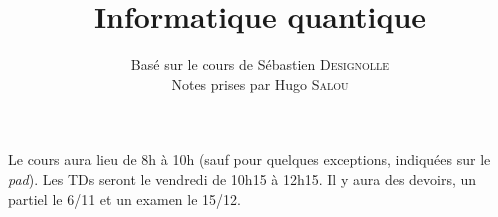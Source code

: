 \documentclass{../notes}
\title{Informatique quantique}
\author{Basé sur le cours de Sébastien \textsc{Designolle} \\ Notes prises par Hugo \textsc{Salou}}
\begin{document}
  \maketitle

  \dominitoc
  \tableofcontents

  \pagebreak

  Le cours aura lieu de 8h à 10h (sauf pour quelques exceptions, indiquées sur le \textit{pad}).
  Les TDs seront le vendredi de 10h15 à 12h15.
  Il y aura des devoirs, un partiel le 6/11 et un examen le 15/12.

  
  
  
\end{document}
